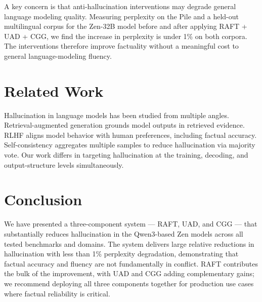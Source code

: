 \documentclass[11pt,a4paper]{article}
\begin{document}
A key concern is that anti-hallucination interventions may degrade general language
modeling quality. Measuring perplexity on the Pile and a held-out multilingual corpus
for the Zen-32B model before and after applying RAFT + UAD + CGG, we find the increase
in perplexity is under 1\% on both corpora. The interventions therefore improve
factuality without a meaningful cost to general language-modeling fluency.

\section{Related Work}
\label{sec:related}

Hallucination in language models has been studied from multiple angles. Retrieval-augmented
generation \cite{lewis2020retrieval} grounds model outputs in retrieved evidence.
RLHF \cite{ouyang2022training} aligns model behavior with human preferences, including
factual accuracy. Self-consistency \cite{wang2022selfconsistency} aggregates multiple
samples to reduce hallucination via majority vote. Our work differs in targeting
hallucination at the training, decoding, and output-structure levels simultaneously.

\section{Conclusion}
\label{sec:conclusion}

We have presented a three-component system — RAFT, UAD, and CGG — that substantially
reduces hallucination in the Qwen3-based Zen models across all tested benchmarks and
domains. The system delivers large relative reductions in hallucination with less than
1\% perplexity degradation, demonstrating that factual accuracy and fluency are not
fundamentally in conflict. RAFT contributes the bulk of the improvement, with UAD and
CGG adding complementary gains; we recommend deploying all three components together for
production use cases where factual reliability is critical.
\end{document}
